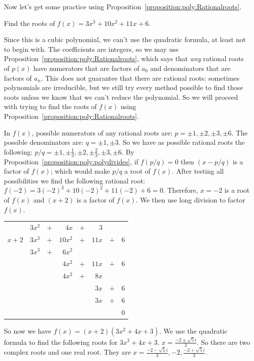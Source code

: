 Now let's get some practice using Proposition~\ref{proposition:poly:Rationalroots}.

\begin{example}{}
Find the roots of $f(x)=3x^3+10x^2+11x+6$.

Since this is a cubic polynomial, we can't use the quadratic formula, at least not to begin with. The coefficients are integers, so we may use Proposition~\ref{proposition:poly:Rationalroots}, which says that \emph{any} rational roots of $p(x)$ have numerators that are factors of $a_{0}$ and denominators that  are factors of $a_{n}$. This does not guarantee that there are rational roots: sometimes polynomials are irreducible, but we still try every method possible to find those roots unless we know that we can't reduce the polynomial. So we will proceed with trying to find the roots of $f(x)$ using Proposition~\ref{proposition:poly:Rationalroots}.

In $f(x)$, possible numerators of any rational roots are: $p=\pm1, \pm2, \pm3, \pm6$. The possible denominators are: $q=\pm1, \pm3$.
So we have as possible rational roots the following: $p/q= \pm1, \pm\frac{1}{3}, \pm2, \pm\frac{2}{3},\pm3, \pm6$.
By Proposition~\ref{proposition:poly:polydivides}, if $f(p/q)=0$ then $(x-p/q)$ is a factor of $f(x)$; which would make $p/q$ a root of $f(x)$. After testing all possibilities we find the following rational root:
$f(-2)=3(-2)^3+10(-2)^2+11(-2)+6=0$. Therefore, $x=-2$ is a root of $f(x)$ and $(x+2)$ is a factor of $f(x)$.
We then use long division to factor $f(x)$.

\begin{center}
\begin{tabular}{rrcrcrcr}
        &  $3x^2$  &  $+$  &      $4x$  &  $+$  &    $3$  &       &       \\ \cline{2-8}
 \multicolumn{1}{r|}{$x + 2$}
        &  $3x^3$  &  $+$  &    $10x^2$  &  $+$  & $ 11x$  &  $+$  &  $6$  \\
        &  $3x^3$  &  $+$  &    $6 x^2$  &       &         &       &       \\ \cline{2-8}
        &         &       &                $4x^2$  & $+$  &  $ 11x$  &  $+$  &  $6$  \\
        &         &       &                $4x^2$  &  $+$  & $ 8x$  &       &       \\ \cline{4-8}
        &         &       &           &       &                         $3 x$  & $+$  & $6$  \\
        &         &       &           &       &                          $3x$  & $+$  & $6$  \\ \cline{6-8}
        &         &       &           &       &         &       &                               $0$
\end{tabular}
\end{center}
So now we have $f(x)=(x+2)(3x^2+4x+3)$. We use the quadratic formula to find the following roots for $3x^2+4x+3$.
$x=\frac{-2\pm \sqrt{5}i}{3}$.
So there are two complex roots and one real root. They are $x={\frac{-2 - \sqrt{5}i}{3}, -2, \frac{-2+ \sqrt{5}i}{3}}$.
\end{example}

